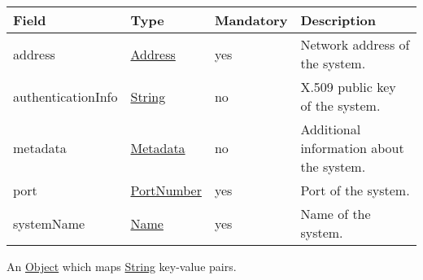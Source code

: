 \documentclass[a4paper]{arrowhead}
\newcommand{\pref}[1]{{\textcolor{ArrowheadGrey}{\hyperref[sec:model:primitives:#1]{#1}}}}
\begin{document}
\label{sec:model:System}

\begin{table}[ht!]
\begin{tabularx}{\textwidth}{| p{4cm} | p{4cm} | p{2cm} | X |} \hline
\rowcolor{gray!33} Field & Type & Mandatory & Description \\ \hline

address &\pref{Address} & yes & Network address of the system. \\ \hline
authenticationInfo &\pref{String} & no & X.509 public key of the system. \\ \hline
metadata &\hyperref[sec:model:Metadata]{Metadata} & no & Additional information about the system. \\ \hline
port &\pref{PortNumber} & yes & Port of the system. \\ \hline
systemName &\pref{Name} & yes & Name of the system. \\ \hline
\end{tabularx}
\end{table}

\label{sec:model:Metadata}

An \pref{Object} which maps \pref{String} key-value pairs.

\clearpage

\label{sec:model:OrchestrationResult}
\end{document}
